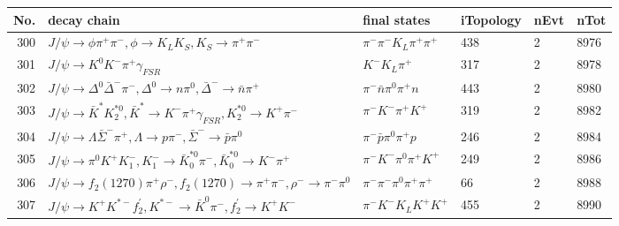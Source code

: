 \begin{table}[htbp] 
\begin{center}
\begin{small}
\begin{tabular}{rlllll}\hline\hline
 No. & decay chain & final states &  iTopology & nEvt & nTot \\\hline
300&$J/\psi       \rightarrow \phi           \pi^{+}        \pi^{-}        , \phi            \rightarrow K_{L}          K_{S}          , K_{S}           \rightarrow \pi^{+}        \pi^{-}        $&$\pi^{-}        \pi^{-}        K_{L}          \pi^{+}        \pi^{+}        $&  438&    2& 8976\\
301&$J/\psi       \rightarrow K^{0}          K^{-}          \pi^{+}        \gamma_{FSR} $&$K^{-}          K_{L}          \pi^{+}        $&  317&    2& 8978\\
302&$J/\psi       \rightarrow \Delta^0          \bar{\Delta}^-   \pi^{-}        , \Delta^0           \rightarrow n                 \pi^{0}        , \bar{\Delta}^-    \rightarrow \bar{n}          \pi^{+}        $&$\pi^{-}        \bar{n}          \pi^{0}        \pi^{+}        n                 $&  443&    2& 8980\\
303&$J/\psi       \rightarrow \bar{K}^{*}   K_2^{*0}       , \bar{K}^{*}    \rightarrow K^{-}          \pi^{+}        \gamma_{FSR} , K_2^{*0}        \rightarrow K^{+}          \pi^{-}        $&$\pi^{-}        K^{-}          \pi^{+}        K^{+}          $&  319&    2& 8982\\
304&$J/\psi       \rightarrow \Lambda           \bar{\Sigma}^-   \pi^{+}        , \Lambda            \rightarrow p                 \pi^{-}        , \bar{\Sigma}^-    \rightarrow \bar{p}          \pi^{0}        $&$\pi^{-}        \bar{p}          \pi^{0}        \pi^{+}        p                 $&  246&    2& 8984\\
305&$J/\psi       \rightarrow \pi^{0}        K^{+}          K_{1}^{-}      , K_{1}^{-}       \rightarrow \bar{K}_0^{*0}\pi^{-}        , \bar{K}_0^{*0} \rightarrow K^{-}          \pi^{+}        $&$\pi^{-}        K^{-}          \pi^{0}        \pi^{+}        K^{+}          $&  249&    2& 8986\\
306&$J/\psi       \rightarrow f_{2}(1270)    \pi^{+}        \rho^{-}      , f_{2}(1270)     \rightarrow \pi^{+}        \pi^{-}        , \rho^{-}       \rightarrow \pi^{-}        \pi^{0}        $&$\pi^{-}        \pi^{-}        \pi^{0}        \pi^{+}        \pi^{+}        $&   66&    2& 8988\\
307&$J/\psi       \rightarrow K^{+}          K^{*-}         f_2^{'}       , K^{*-}          \rightarrow \bar{K}^{0}   \pi^{-}        , f_2^{'}        \rightarrow K^{+}          K^{-}          $&$\pi^{-}        K^{-}          K_{L}          K^{+}          K^{+}          $&  455&    2& 8990\\

\end{tabular}
\end{small}
\end{center}
\end{table}
